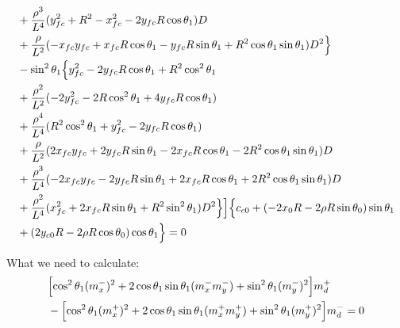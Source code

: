 \documentclass[12pt]{article}
\begin{document}
\begin{align}
    &+ \frac{\rho^3}{L^4}(y_{fc}^2 +R^2 -x_{fc}^2 -2y_{fc}R\cos\theta_1)D \nonumber\\
    &+ \frac{\rho}{L^2}(-x_{fc}y_{fc} + x_{fc}R\cos\theta_1 -y_{fc}R\sin\theta_1 +  R^2\cos\theta_1\sin\theta_1 )D^2 \Bigr\} \nonumber\\
    &- \sin^2\theta_1 \Bigl\{ y_{fc}^2 -2y_{fc}R\cos\theta_1 + R^2\cos^2\theta_1\nonumber\\
    &+ \frac{\rho^2}{L^2}(-2y_{fc}^2  -2R\cos^2\theta_1 + 4y_{fc}R\cos\theta_1) \nonumber\\
    &+\frac{\rho^4}{L^4}(R^2\cos^2\theta_1 + y_{fc}^2 -2y_{fc}R\cos\theta_1) \nonumber\\
    &+ \frac{\rho}{L^2}(2x_{fc}y_{fc} + 2y_{fc}R\sin\theta_1  -2x_{fc}R\cos\theta_1 -2R^2\cos\theta_1\sin\theta_1)D \nonumber\\
    &+ \frac{\rho^3}{L^4}(- 2x_{fc}y_{fc} - 2y_{fc}R\sin\theta_1 + 2x_{fc}R\cos\theta_1 + 2R^2\cos\theta_1\sin\theta_1)D \nonumber\\
    &+ \frac{\rho^2}{L^4}(x_{fc}^2 + 2x_{fc}R\sin\theta_1 + R^2\sin^2\theta_1)D^2 \Bigr\} \Bigr] \Bigl\{ c_{c0} +(- 2x_0R - 2\rho R\sin\theta_0)\sin\theta_1 \nonumber\\
    &+ (2y_{c0}R -2\rho R\cos\theta_0)\cos\theta_1 \Bigr\} = 0
\end{align}


What we need to calculate:
\begin{align}
    &\Bigl[\cos^2\theta_1(m_x^-)^2 + 2\cos\theta_1\sin\theta_1 (m_x^-m_y^-)  + \sin^2\theta_1(m_y^-)^2 \Bigr] m_d^+ \nonumber\\
    &- \Bigl[ \cos^2\theta_1(m_x^+)^2  + 2\cos\theta_1\sin\theta_1(m_x^+m_y^+)  +\sin^2\theta_1(m_y^+)^2 \Bigr] m_d^- = 0
\end{align}
\end{document}
